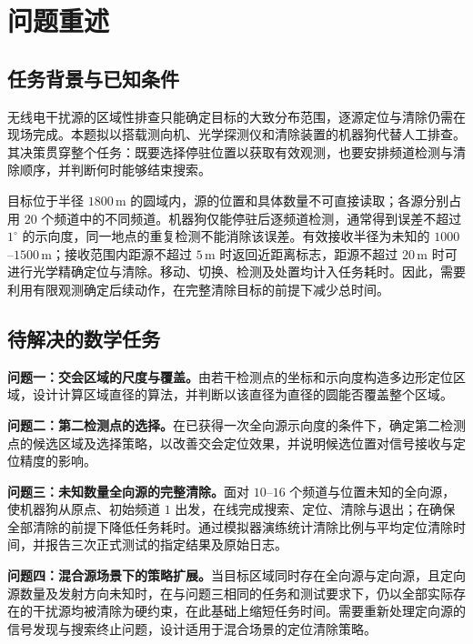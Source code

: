 \section{问题重述}

\subsection{任务背景与已知条件}
无线电干扰源的区域性排查只能确定目标的大致分布范围，逐源定位与清除仍需在现场完成。本题拟以搭载测向机、光学探测仪和清除装置的机器狗代替人工排查。其决策贯穿整个任务：既要选择停驻位置以获取有效观测，也要安排频道检测与清除顺序，并判断何时能够结束搜索。

目标位于半径 $1800\,\mathrm{m}$ 的圆域内，源的位置和具体数量不可直接读取；各源分别占用 $20$ 个频道中的不同频道。机器狗仅能停驻后逐频道检测，通常得到误差不超过 $1^\circ$ 的示向度，同一地点的重复检测不能消除该误差。有效接收半径为未知的 $1000$--$1500\,\mathrm{m}$；接收范围内距源不超过 $5\,\mathrm{m}$ 时返回近距离标志，距源不超过 $20\,\mathrm{m}$ 时可进行光学精确定位与清除。移动、切换、检测及处置均计入任务耗时。因此，需要利用有限观测确定后续动作，在完整清除目标的前提下减少总时间。

\subsection{待解决的数学任务}
\textbf{问题一：交会区域的尺度与覆盖。}由若干检测点的坐标和示向度构造多边形定位区域，设计计算区域直径的算法，并判断以该直径为直径的圆能否覆盖整个区域。

\textbf{问题二：第二检测点的选择。}在已获得一次全向源示向度的条件下，确定第二检测点的候选区域及选择策略，以改善交会定位效果，并说明候选位置对信号接收与定位精度的影响。

\textbf{问题三：未知数量全向源的完整清除。}面对 $10$--$16$ 个频道与位置未知的全向源，使机器狗从原点、初始频道 $1$ 出发，在线完成搜索、定位、清除与退出；在确保全部清除的前提下降低任务耗时。通过模拟器演练统计清除比例与平均定位清除时间，并报告三次正式测试的指定结果及原始日志。

\textbf{问题四：混合源场景下的策略扩展。}当目标区域同时存在全向源与定向源，且定向源数量及发射方向未知时，在与问题三相同的任务和测试要求下，仍以全部实际存在的干扰源均被清除为硬约束，在此基础上缩短任务时间。需要重新处理定向源的信号发现与搜索终止问题，设计适用于混合场景的定位清除策略。
